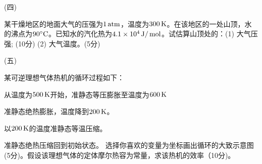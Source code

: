 \documentclass[12pt,CJK]{article}
\begin{document}
  \item[(四)]{某干燥地区的地面大气的压强为$1\,\mathrm{atm}$，温度为$300\,\mathrm{K}$。在该地区的一处山顶，水的沸点为$90^\circ \mathrm{C}$。已知水的汽化热为$4.1\times 10^4\,\mathrm{J}/\,\mathrm{mol}$。试估算山顶处的：(1) 大气压强; (10分) (2) 大气温度。(5分)
    
       \vspace{3.2in}
  }
    
  


\item[(五)]{某可逆理想气体热机的循环过程如下：
      \bitem
    \item{从温度为$500\,\mathrm{K}$开始，准静态等压膨胀至温度为$600\,\mathrm{K}$}
    \item{准静态绝热膨胀，温度降到$200\,\mathrm{K}$。}
    \item{以$200\,\mathrm{K}$的温度准静态等温压缩。}
    \item{准静态绝热压缩回到初始状态。}            
      \eitem
      选择你喜欢的变量为坐标画出循环的大致示意图(5分)。假设该理想气体的定体摩尔热容为常量，求该热机的效率（10分)。
    }
  

\eitem



\ech
\end{document}
